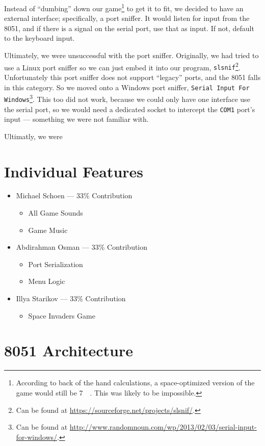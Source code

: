 \documentclass[12pt]{article}
\newcommand{\shellcmd}[1]{\texttt{\colorbox{gray!30}{#1}}}
\begin{document}
Instead of ``dumbing'' down our game\footnote{According to back of the hand calculations, a space-optimized version of the game would still be \SI{7}{\kilo\byte}. This was likely to be impossible.} to get it to fit, we decided to have an external interface; specifically, a port sniffer. It would listen for input from the \num{8051}, and if there is a signal on the serial port, use that as input. If not, default to the keyboard input.

Ultimately, we were unsuccessful with the port sniffer. Originally, we had tried to use a Linux port sniffer so we can just embed it into our program, \shellcmd{slsnif}\footnote{Can be found at \url{https://sourceforge.net/projects/slsnif/}.}. Unfortunately this port sniffer does not support ``legacy'' ports, and the \num{8051} falls in this category. So we moved onto a Windows port sniffer, \shellcmd{Serial Input For Windows}\footnote{Can be found at \url{http://www.randomnoun.com/wp/2013/02/03/serial-input-for-windows/}.}. This too did not work, because we could only have one interface use the serial port, so we would need a dedicated socket to intercept the \shellcmd{COM1} port's input --- something we were not familiar with.

Ultimatly, we were


\section{Individual Features}
\begin{itemize}
    \item Michael Schoen --- 33\% Contribution
    \begin{itemize}
        \item All Game Sounds
        \item Game Music
    \end{itemize}

    \item Abdirahman Osman --- 33\% Contribution
    \begin{itemize}
        \item Port Serialization
        \item Menu Logic
    \end{itemize}

    \item Illya Starikov --- 33\% Contribution
    \begin{itemize}
        \item Space Invaders Game
    \end{itemize}
\end{itemize}

\section{8051 Architecture}
\end{document}
